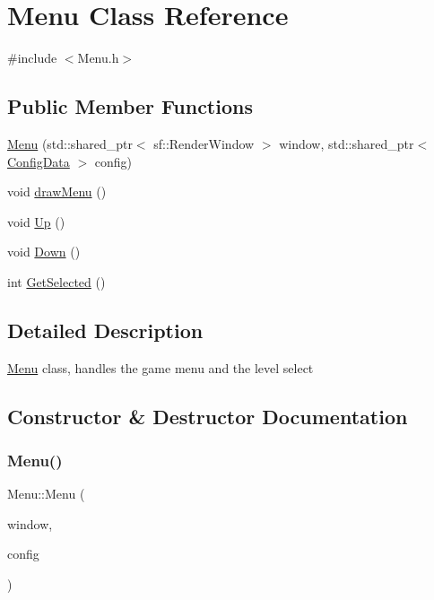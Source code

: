 \hypertarget{classMenu}{}\section{Menu Class Reference}
\label{classMenu}


{\ttfamily \#include $<$Menu.\+h$>$}

\subsection*{Public Member Functions}
\begin{DoxyCompactItemize}
\item 
\hyperlink{classMenu_a059f49ef452f21afc977008f58117aeb}{Menu} (std\+::shared\+\_\+ptr$<$ sf\+::\+Render\+Window $>$ window, std\+::shared\+\_\+ptr$<$ \hyperlink{classConfigData}{Config\+Data} $>$ config)
\item 
void \hyperlink{classMenu_a9df102abcebc51e69c4728dc3d3c3be0}{draw\+Menu} ()
\item 
void \hyperlink{classMenu_a7477c08823e9322963d9cac0b326d87f}{Up} ()
\item 
void \hyperlink{classMenu_a2963765d4666e9f4dea6b3e508a020a9}{Down} ()
\item 
int \hyperlink{classMenu_a30033d60fd0e4dedc92fb298ecfda7f8}{Get\+Selected} ()
\end{DoxyCompactItemize}


\subsection{Detailed Description}
\hyperlink{classMenu}{Menu} class, handles the game menu and the level select 

\subsection{Constructor \& Destructor Documentation}
\mbox{\label{classMenu_a059f49ef452f21afc977008f58117aeb}} 
\subsubsection{\texorpdfstring{Menu()}{Menu()}}
{\footnotesize\ttfamily Menu\+::\+Menu (\begin{DoxyParamCaption}\item[{std\+::shared\+\_\+ptr$<$ sf\+::\+Render\+Window $>$}]{window,  }\item[{std\+::shared\+\_\+ptr$<$ \hyperlink{classConfigData}{Config\+Data} $>$}]{config }\end{DoxyParamCaption})}

